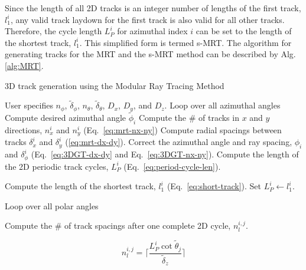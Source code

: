 Since the length of all 2D tracks is an integer number of lengths of the first track, $l_1^i$, any valid track laydown for the first track is also valid for all other tracks. Therefore, the cycle length $L_P^i$ for azimuthal index $i$ can be set to the length of the shortest track, $l_1^i$. This simplified form is termed \ac{s-MRT}. The algorithm for generating tracks for the \ac{MRT} and the \ac{s-MRT} method can be described by Alg. \ref{alg:MRT}. 

\begin{algorithm*}[!h]
	\caption{3D track generation using the Modular Ray Tracing Method}
	\label{alg:MRT}
	\begin{algorithmic}
		\State User specifies $n_{\phi}$, $\tilde{\delta}_{\phi}$, $n_{\theta}$, $\tilde{\delta}_{\theta}$, $D_x$, $D_y$, and $D_z$. \hspace{\fill}
		\vspace{0.1in}
		 \Comment Loop over all azimuthal angles
		\vspace{0.1in}
		\State Compute desired azimuthal angle $\tilde{\phi}_i$
		\State Compute the \# of tracks in $x$ and $y$ directions, $n_x^i$ and $n_y^i$ (Eq.~\ref{eq:mrt-nx-ny}) \hspace{\fill}
		\State Compute radial spacings between tracks $\delta_x^i$ and $\delta_y^i$ (\ref{eq:mrt-dx-dy}). \hspace{\fill}
		\State Correct the azimuthal angle and ray spacing, $\phi_i$ and $\delta_{\phi}^i$ (Eq.~\ref{eq:3DGT-dx-dy} and Eq.~\ref{eq:3DGT-nx-ny}).\hspace{\fill}
		\vspace{0.1in}
		\State Compute the length of the 2D periodic track cycles, $L_P^{i}$ (Eq.~\ref{eq:period-cycle-len}).
		
		\Else
		\State Compute the length of the shortest track, $l_1^i$ (Eq.~\ref{eq:short-track}). 
		\State Set $L_P^{i} \gets l_1^i$.
		
		\EndIf
		
		\vspace{0.1in}
		
		
		 \Comment Loop over all polar angles
		
		\vspace{0.2in}
		\State Compute the \# of track spacings after one complete 2D cycle, $n_l^{i,j}$.
		
		\begin{equation}
		n_l^{i,j} = \Bigg\lceil \frac{L_P^i \cot{\tilde{\theta}_{j}}}{\tilde{\delta}_z} \Bigg\rceil
		\nonumber
		\end{equation}
		

\end{algorithmic}
\end{algorithm*}
